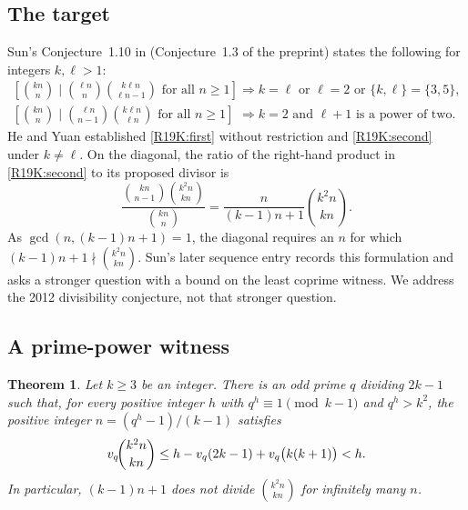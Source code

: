 \documentclass[11pt,a4paper]{article}
\newtheorem{SourceRbjKtheorem}{Theorem}
\begin{document}
\subsection{The target}
Sun's Conjecture~1.10 in \cite[p.~193]{R19K:Sun} (Conjecture~1.3 of the
preprint) states the following for integers $k,\ell>1$:
\begin{align}
\left[\binom{kn}{n}\mid\binom{\ell n}{n}\binom{k\ell n}{\ell n-1}
   \text{ for all }n\ge1\right]
   &\Longrightarrow k=\ell\text{ or }\ell=2\text{ or }\{k,\ell\}=\{3,5\},
   \label{R19K:first}\\
\left[\binom{kn}{n}\mid\binom{\ell n}{n-1}\binom{k\ell n}{\ell n}
   \text{ for all }n\ge1\right]
   &\Longrightarrow k=2\text{ and }\ell+1\text{ is a power of two}.
   \label{R19K:second}
\end{align}
He and Yuan \cite[Theorems~1.8--1.9 and the subsequent remark]{R19K:HY}
established \eqref{R19K:first} without restriction and \eqref{R19K:second}
under $k\ne\ell$. On the diagonal, the ratio of the right-hand product
in \eqref{R19K:second} to its proposed divisor is
\begin{equation}
\frac{\binom{kn}{n-1}\binom{k^2n}{kn}}{\binom{kn}{n}}
=\frac{n}{(k-1)n+1}\binom{k^2n}{kn}.
\label{R19K:ratio}
\end{equation}
As $\gcd(n,(k-1)n+1)=1$, the diagonal requires an $n$ for which
$(k-1)n+1\nmid\binom{k^2n}{kn}$. Sun's later sequence entry
\cite{R19K:SunOEIS} records this formulation and asks a stronger question
with a bound on the least coprime witness. We address the 2012
divisibility conjecture, not that stronger question.

\subsection{A prime-power witness}
\begin{SourceRbjKtheorem}\label{R19K:thm}
Let $k\ge3$ be an integer. There is an odd prime $q$ dividing $2k-1$
such that, for every positive integer $h$ with
$q^h\equiv1\pmod{k-1}$ and $q^h>k^2$, the positive integer
$n=(q^h-1)/(k-1)$ satisfies
\[
v_q\!\binom{k^2n}{kn}
\le h-v_q(2k-1)+v_q\bigl(k(k+1)\bigr)<h.
\]
In particular, $(k-1)n+1$ does not divide $\binom{k^2n}{kn}$ for
infinitely many $n$.
\end{SourceRbjKtheorem}
\end{document}
